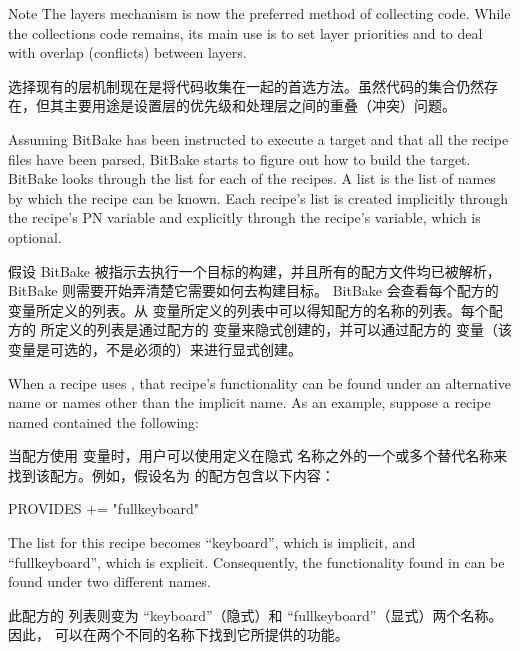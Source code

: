 \begin{noteblock}{Note}%
The layers mechanism is now the preferred method of collecting code. While the collections code remains, its main use is to set layer priorities and to deal with overlap (conflicts) between layers.

\medskip
选择现有的层机制现在是将代码收集在一起的首选方法。虽然代码的集合仍然存在，但其主要用途是设置层的优先级和处理层之间的重叠（冲突）问题。

\end{noteblock}


Assuming BitBake has been instructed to execute a target and that all the recipe files have been parsed, BitBake starts to figure out how to build the target. BitBake looks through the  list for each of the recipes. A  list is the list of names by which the recipe can be known. Each recipe's  list is created implicitly through the recipe's PN variable and explicitly through the recipe's  variable, which is optional.

假设 BitBake 被指示去执行一个目标的构建，并且所有的配方文件均已被解析，BitBake 则需要开始弄清楚它需要如何去构建目标。 BitBake 会查看每个配方的  变量所定义的列表。从  变量所定义的列表中可以得知配方的名称的列表。每个配方的  所定义的列表是通过配方的  变量来隐式创建的，并可以通过配方的  变量（该变量是可选的，不是必须的）来进行显式创建。

When a recipe uses  , that recipe's functionality can be found under an alternative name or names other than the implicit  name. As an example, suppose a recipe named  contained the following:

当配方使用  变量时，用户可以使用定义在隐式  名称之外的一个或多个替代名称来找到该配方。例如，假设名为  的配方包含以下内容：

\begin{pyglist}
PROVIDES += "fullkeyboard"
\end{pyglist}

The  list for this recipe becomes ``keyboard'', which is implicit, and ``fullkeyboard'', which is explicit. Consequently, the functionality found in  can be found under two different names.

此配方的  列表则变为 ``keyboard''（隐式）和 ``fullkeyboard''（显式）两个名称。因此， 可以在两个不同的名称下找到它所提供的功能。

